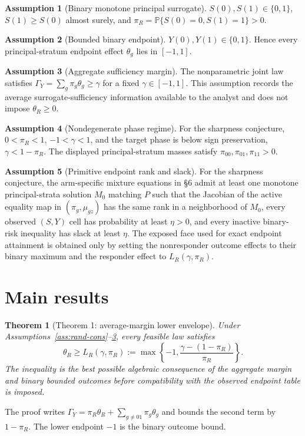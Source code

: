 \documentclass[11pt]{article}
\renewcommand{\Pr}{\mathbb{P}}
\theoremstyle{definition}
\newtheorem{assumption}{Assumption}
\theoremstyle{plain}
\newtheorem{theorem}{Theorem}
\theoremstyle{remark}
\begin{document}
\begin{assumption}[Binary monotone principal surrogate]\label{ass:mono}
\(S(0),S(1)\in\{0,1\}\), \(S(1)\ge S(0)\) almost surely, and \(\pi_R=\Pr\{S(0)=0,S(1)=1\}>0\).
\end{assumption}

\begin{assumption}[Bounded binary endpoint]\label{ass:binary-y}
\(Y(0),Y(1)\in\{0,1\}\).  Hence every principal-stratum endpoint effect \(\theta_g\) lies in \([-1,1]\).
\end{assumption}

\begin{assumption}[Aggregate sufficiency margin]\label{ass:margin}
The nonparametric joint law satisfies \(\Gamma_Y=\sum_g\pi_g\theta_g\ge\gamma\) for a fixed \(\gamma\in[-1,1]\).  This assumption records the average surrogate-sufficiency information available to the analyst and does not impose \(\theta_R\ge0\).
\end{assumption}

\begin{assumption}[Nondegenerate phase regime]\label{ass:nondeg}
For the sharpness conjecture, \(0<\pi_R<1\), \(-1<\gamma<1\), and the target phase is below sign preservation, \(\gamma<1-\pi_R\).  The displayed principal-stratum masses satisfy \(\pi_{00},\pi_{01},\pi_{11}>0\).
\end{assumption}

\begin{assumption}[Primitive endpoint rank and slack]\label{ass:endpoint-compatible}
For the sharpness conjecture, the arm-specific mixture equations in \S6 admit at least one monotone principal-strata solution \(M_0\) matching \(P\) such that the Jacobian of the active equality map in \((\pi_g,\mu_{gz})\) has the same rank in a neighborhood of \(M_0\), every observed \((S,Y)\) cell has probability at least \(\eta>0\), and every inactive binary-risk inequality has slack at least \(\eta\).  The exposed face used for exact endpoint attainment is obtained only by setting the nonresponder outcome effects to their binary maximum and the responder effect to \(L_R(\gamma,\pi_R)\).
\end{assumption}

\section{Main results}
\begin{theorem}[Theorem 1: average-margin lower envelope]\label{thm:lower-envelope}
Under Assumptions~\ref{ass:rand-cons}--\ref{ass:margin}, every feasible law satisfies
\[
  \theta_R\ge L_R(\gamma,\pi_R):=\max\left\{-1,\frac{\gamma-(1-\pi_R)}{\pi_R}\right\}.
\]
The inequality is the best possible algebraic consequence of the aggregate margin and binary bounded outcomes before compatibility with the observed endpoint table is imposed.
\end{theorem}
The proof writes \(\Gamma_Y=\pi_R\theta_R+\sum_{g\ne 01}\pi_g\theta_g\) and bounds the second term by \(1-\pi_R\).  The lower endpoint \(-1\) is the binary outcome bound.
\end{document}
